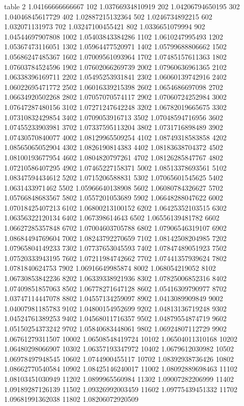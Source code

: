 table {%
2 1.04166666666667
102 1.03766934810919
202 1.04206794650195
302 1.04046845617729
402 1.02887215132364
502 1.0246734892215
602 1.032071131973
702 1.03247100455421
802 1.0336651079994
902 1.04544697907808
1002 1.05403843384286
1102 1.0610247995493
1202 1.05367473116051
1302 1.05964477520971
1402 1.05799688806662
1502 1.05686247485367
1602 1.07009561093964
1702 1.07485157611363
1802 1.07603784524596
1902 1.07602066269739
2002 1.07960636961365
2102 1.06338396169711
2202 1.05495253931841
2302 1.06060139742916
2402 1.06022695471772
2502 1.06016339215398
2602 1.0654686697098
2702 1.06634920502268
2802 1.07057070574117
2902 1.07060724252984
3002 1.07647287480156
3102 1.07271247642248
3202 1.06782019665675
3302 1.07310832429854
3402 1.0709053916713
3502 1.07048594716956
3602 1.07455233903981
3702 1.07337595113204
3802 1.0731716898489
3902 1.07430570840077
4002 1.08129965509254
4102 1.08749318583858
4202 1.08565065052904
4302 1.0826190814383
4402 1.08183638704372
4502 1.08100193677954
4602 1.0804820797261
4702 1.08126285847767
4802 1.07210586407295
4902 1.07465227158371
5002 1.08513378693561
5102 1.08347594434612
5202 1.0715206588831
5302 1.07065601545625
5402 1.0631433971462
5502 1.05966640138908
5602 1.06080784326627
5702 1.05766848683567
5802 1.0557201053689
5902 1.06648288047622
6002 1.07018425407213
6102 1.06800213100152
6202 1.06425352103515
6302 1.06356322120134
6402 1.067398614643
6502 1.06556139481782
6602 1.06627285357848
6702 1.07004603705788
6802 1.07906546319107
6902 1.08684494769604
7002 1.08243792270659
7102 1.08142508204985
7202 1.07965804149233
7302 1.07737653045593
7402 1.07847489051923
7502 1.07520333943195
7602 1.07211984742662
7702 1.07441357939624
7802 1.0781840624753
7902 1.06916649985874
8002 1.068054219052
8102 1.06730853842236
8202 1.06339338921936
8302 1.07825006852316
8402 1.07409851857063
8502 1.06778271647128
8602 1.05416309790977
8702 1.03747114447078
8802 1.04557134259097
8902 1.0413089909849
9002 1.04007981185783
9102 1.04800154952699
9202 1.04813136719248
9302 1.04524761389253
9402 1.04568011716357
9502 1.04879554874719
9602 1.05150254373242
9702 1.05840683448061
9802 1.06924807112729
9902 1.06761279311507
10002 1.06508548419724
10102 1.06504011310168
10202 1.06480298066907
10302 1.06357193347972
10402 1.0679612030982
10502 1.06978497948545
10602 1.0744900455117
10702 1.08392938736426
10802 1.08662770540584
10902 1.08425146240017
11002 1.08092889698463
11102 1.08103451030949
11202 1.0899965560984
11302 1.09007282206999
11402 1.09189287126139
11502 1.09326992003459
11602 1.09775439451332
11702 1.09681991362038
11802 1.08206072920509
}
